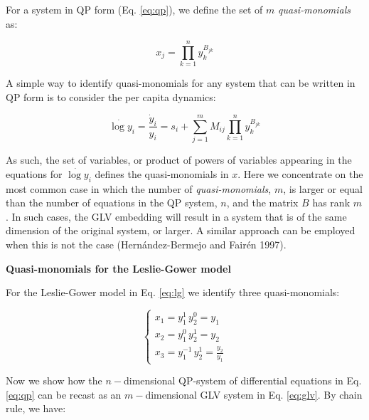 \documentclass{article}
\begin{document}
\label{sec:qptoglv}

For a system in QP form (Eq. \ref{eq:qp}), we define the set of \(m\)
\emph{quasi-monomials} as:

\begin{equation}
\label{eq:quasimono}
x_j = \prod_{k=1}^n y_k^{B_{jk}}
\end{equation}

A simple way to identify quasi-monomials for any system that can be
written in QP form is to consider the per capita dynamics:

\begin{equation}
\dot{\log y}_i = \frac{\dot{y}_i}{y_i} = s_i + \sum_{j = 1}^m M_{ij} \prod_{k = 1}^n y_k^{B_{jk}}
\end{equation}

As such, the set of variables, or product of powers of variables
appearing in the equations for \(\dot{\log y}_i\) defines the
quasi-monomials in \(x\). Here we concentrate on the most common case in
which the number of \emph{quasi-monomials}, \(m\), is larger or equal
than the number of equations in the QP system, \(n\), and the matrix
\(B\) has rank \(m\). In such cases, the GLV embedding will result in a
system that is of the same dimension of the original system, or larger.
A similar approach can be employed when this is not the case
(Hernández-Bermejo and Fairén 1997).

\begin{cb}
\textbf{Quasi-monomials for the Leslie-Gower model}

For the Leslie-Gower model in Eq. \ref{eq:lg} we identify three quasi-monomials:

\begin{equation}
\label{eq:lgqm}
\begin{cases}
x_1 = y_1^1 \, y_2^0 = y_1\\
x_2 = y_1^0 \, y_2^1 = y_2\\
x_3 = y_1^{-1} \, y_2^1 = \frac{y_2}{y_1}
\end{cases}
\end{equation}

\end{cb}

Now we show how the \(n-\)dimensional QP-system of differential
equations in Eq. \ref{eq:qp} can be recast as an \(m-\)dimensional GLV
system in Eq. \ref{eq:glv}. By chain rule, we have:
\end{document}
